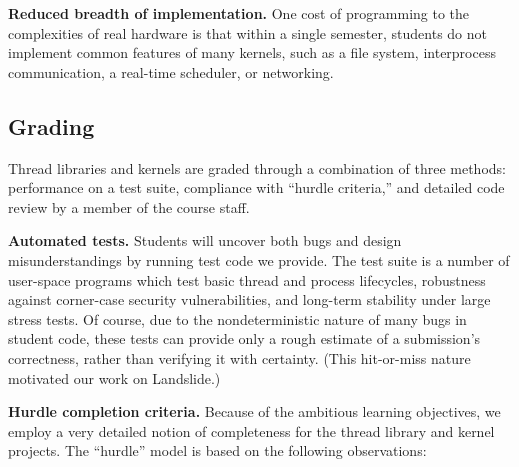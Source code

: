 \textbf{Reduced breadth of implementation.}
One cost of programming to the complexities of
real hardware is that
within %
a single semester,
students do not %
implement common features of many kernels,
such as a file system, interprocess communication,
a real-time scheduler,
or networking.


\subsection{Grading}

Thread libraries and kernels
are graded through a combination
of three methods:
performance on a test suite,
compliance with ``hurdle criteria,''
and detailed code review by a member of the course staff.

\textbf{Automated tests.}
Students will uncover both bugs
and design misunderstandings by running test code we
provide.
The test suite is a number of user-space programs
which test
basic thread and process lifecycles, robustness
against corner-case security vulnerabilities, and long-term stability
under large stress tests.
%
%
Of course, due to the nondeterministic nature of many bugs in student code,
these tests can provide only a rough estimate of a submission's correctness,
rather than verifying it with certainty.
(This hit-or-miss nature motivated our work on Landslide.)

\textbf{Hurdle completion criteria.}
Because of the ambitious learning objectives,
we employ a very detailed notion of completeness
for the thread library and kernel projects.
The ``hurdle'' model is based on the following observations:

